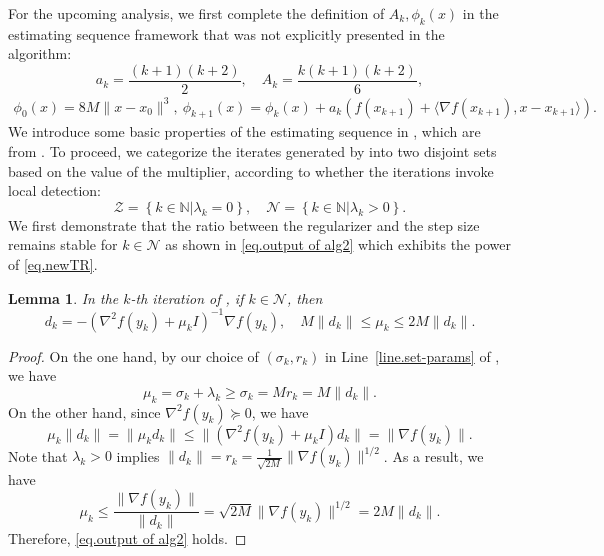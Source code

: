 \documentclass{article}
\newtheorem{lemma}[theorem]{Lemma}
\numberwithin{equation}{section}
\numberwithin{equation}{section}
\begin{document}
For the upcoming analysis, we first complete the definition of $A_k,\phi_k(x)$ in the estimating sequence framework that was not explicitly presented in the algorithm:
\begin{equation}
    \label{eq.update a and A}
    a_k = \frac{(k+1)(k+2)}{2}, \quad A_k=\frac{k(k+1)(k+2)}{6},
\end{equation}
\begin{align}\label{eq.update phi}
    \phi_0(x) = 8M\|x-x_0\|^3, \ \phi_{k+1}(x) =\phi_k(x)+a_k\left (f(x_{k+1})+\langle \nabla f(x_{k+1}),x-x_{k+1}\rangle \right ).
\end{align}
We introduce some basic properties of the estimating sequence in , which are from \citet{nesterov2018lectures}. To proceed, we categorize the iterates generated by  into two disjoint sets based on the value of the multiplier, according to whether the iterations invoke local detection:
\begin{equation}
    \label{eq.outer index catagory}
    \mathcal{Z} = \left \{k\in \mathbb{N} | \lambda_k=0\right\}, \quad \mathcal{N} = \left \{ k\in\mathbb{N} |  \lambda_k>0\right\}.
\end{equation}
We first demonstrate that the ratio between the regularizer and the step size remains stable for $k\in\mathcal{N}$ as shown in \eqref{eq.output of alg2} which exhibits the power of \ref{eq.newTR}.
\begin{lemma}
    \label{lem.ratio pass nonzero}
    In the $k$-th iteration of , if $k\in\mathcal{N}$, then
    \begin{equation}
        \label{eq.output of alg2}
        d_k = -(\nabla^2 f(y_k)+\mu_k I )^{-1}\nabla f(y_k), \quad
        M\|d_k\|\leq \mu_k \leq 2M\|d_k\|.
    \end{equation}
\end{lemma}
\begin{proof}
    On the one hand, by our choice of $(\sigma_k,r_k)$ in Line~\ref{line.set-params} of , we have $$\mu_k=\sigma_k+\lambda_k\geq\sigma_k= Mr_k= M\|d_k\|.$$
    On the other hand, since $\nabla^2 f(y_k)\succeq 0$, we have
    \begin{equation*}
        \mu_k\|d_k\|=\|\mu_kd_k\|\leq \|(\nabla^2 f(y_k)+\mu_k I)d_k\|=\|\nabla f(y_k)\|.
    \end{equation*}
    Note that $\lambda_k>0$ implies $\|d_k\|=r_k=\frac{1}{\sqrt{2M}}\|\nabla f(y_k)\|^{1/2}$. As a result, we have
    \begin{equation*}
        \mu_k\leq \frac{\|\nabla f(y_k)\|}{\|d_k\|}=\sqrt{2M}\|\nabla f(y_k)\|^{1/2}=2M\|d_k\|.
    \end{equation*}
    Therefore, \eqref{eq.output of alg2} holds.
\end{proof}
\end{document}
